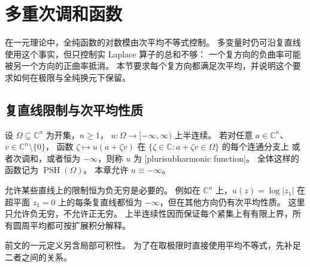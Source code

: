 \section{多重次调和函数}
\label{b3:sec:2903}

在一元理论中，全纯函数的对数模由次平均不等式控制。
多变量时仍可沿复直线使用这个事实，但只控制实 Laplace 算子的总和不够：
一个复方向的负曲率可能被另一个方向的正曲率抵消。
本节要求每个复方向都满足次平均，并说明这个要求如何在极限与全纯换元下保留。

\subsection{复直线限制与次平均性质}
\label{b3:subsec:290301}

\begin{definition}\label{b3:def:29-psh}
设 \(\Omega\subseteq\mathbb C^n\) 为开集，\(n\ge1\)，
\(u:\Omega\to[-\infty,\infty)\) 上半连续。
若对任意 \(a\in\mathbb C^n\)、\(v\in\mathbb C^n\setminus\{0\}\)，
函数 \(\zeta\mapsto u(a+\zeta v)\) 在
\(\{\zeta\in\mathbb C:a+\zeta v\in\Omega\}\) 的每个连通分支上
或者次调和，或者恒为 \(-\infty\)，则称 \(u\) 为
[plurisubharmonic function]。
全体这样的函数记为 \(\operatorname{PSH}(\Omega)\)。
本章允许 \(u\equiv-\infty\)。
\end{definition}

允许某些直线上的限制恒为负无穷是必要的。
例如在 \(\mathbb C^n\) 上，\(u(z)=\log|z_1|\) 在超平面 \(z_1=0\)
上的每条复直线都恒为 \(-\infty\)，但在其他方向仍有次平均性质。
这里只允许负无穷，不允许正无穷。
上半连续性因而保证每个紧集上有有限上界，所有圆周平均都可按扩展积分解释。

\ProseParagraphBreak
前文的一元定义另含局部可积性。
为了在取极限时直接使用平均不等式，先补足二者之间的关系。


